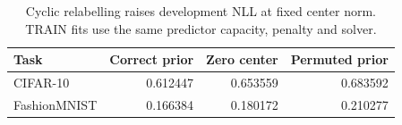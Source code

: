 \begin{table}[!htb]\centering\small\setlength{\tabcolsep}{3pt}
\caption{Cyclic relabelling raises development NLL at fixed center norm. TRAIN fits use the same predictor capacity, penalty and solver.}\label{tab:mechanism}
\begin{tabular}{lrrr}\toprule
Task & Correct prior & Zero center & Permuted prior\\\midrule
CIFAR-10 & 0.612447 & 0.653559 & 0.683592\\
FashionMNIST & 0.166384 & 0.180172 & 0.210277\\\bottomrule
\end{tabular}
\end{table}
